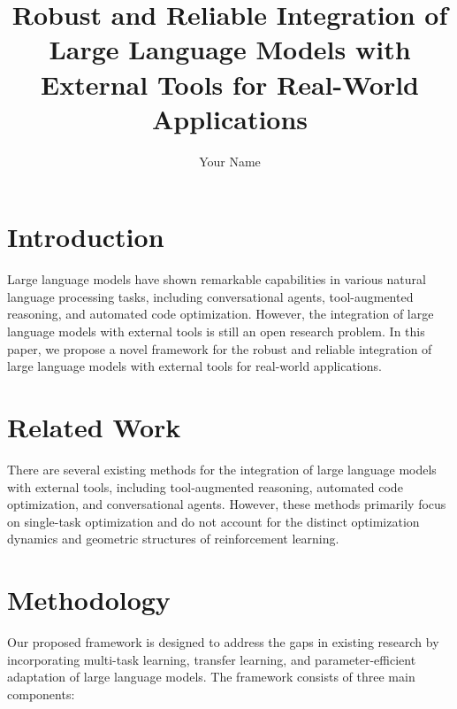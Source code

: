 \documentclass{article}
\begin{document}
\title{Robust and Reliable Integration of Large Language Models with External Tools for Real-World Applications}

\author{Your Name}


\section{Introduction}

Large language models have shown remarkable capabilities in various natural language processing tasks, including conversational agents, tool-augmented reasoning, and automated code optimization. However, the integration of large language models with external tools is still an open research problem. In this paper, we propose a novel framework for the robust and reliable integration of large language models with external tools for real-world applications.

\section{Related Work}

There are several existing methods for the integration of large language models with external tools, including tool-augmented reasoning, automated code optimization, and conversational agents. However, these methods primarily focus on single-task optimization and do not account for the distinct optimization dynamics and geometric structures of reinforcement learning.

\section{Methodology}

Our proposed framework is designed to address the gaps in existing research by incorporating multi-task learning, transfer learning, and parameter-efficient adaptation of large language models. The framework consists of three main components:
\end{document}
